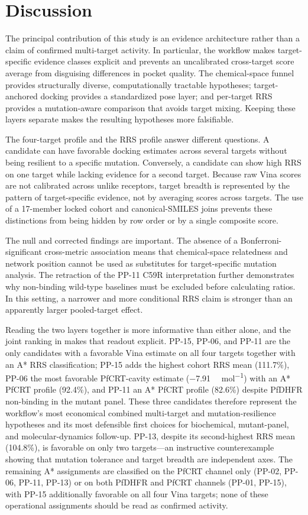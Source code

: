 \documentclass[journal=jcisd8,manuscript=article]{achemso}
\begin{document}
\section{Discussion}
The principal contribution of this study is an evidence architecture rather than a claim of confirmed multi-target activity. In particular, the workflow makes target-specific evidence classes explicit and prevents an uncalibrated cross-target score average from disguising differences in pocket quality. The chemical-space funnel provides structurally diverse, computationally tractable hypotheses; target-anchored docking provides a standardized pose layer; and per-target RRS provides a mutation-aware comparison that avoids target mixing. Keeping these layers separate makes the resulting hypotheses more falsifiable.

The four-target profile and the RRS profile answer different questions. A candidate can have favorable docking estimates across several targets without being resilient to a specific mutation. Conversely, a candidate can show high RRS on one target while lacking evidence for a second target. Because raw Vina scores are not calibrated across unlike receptors, target breadth is represented by the pattern of target-specific evidence, not by averaging scores across targets. The use of a 17-member locked cohort and canonical-SMILES joins prevents these distinctions from being hidden by row order or by a single composite score.

The null and corrected findings are important. The absence of a Bonferroni-significant cross-metric association means that chemical-space relatedness and network position cannot be used as substitutes for target-specific mutation analysis. The retraction of the PP-11 C59R interpretation further demonstrates why non-binding wild-type baselines must be excluded before calculating ratios. In this setting, a narrower and more conditional RRS claim is stronger than an apparently larger pooled-target effect.

Reading the two layers together is more informative than either alone, and the joint ranking in  makes that readout explicit. PP-15, PP-06, and PP-11 are the only candidates with a favorable Vina estimate on all four targets together with an A* RRS classification; PP-15 adds the highest cohort RRS mean (\num{111.7}\%), PP-06 the most favorable PfCRT-cavity estimate (\num{-7.91} \si{\kilo\calorie\per\mole}) with an A* PfCRT profile (\num{92.4}\%), and PP-11 an A* PfCRT profile (\num{82.6}\%) despite PfDHFR non-binding in the mutant panel. These three candidates therefore represent the workflow's most economical combined multi-target and mutation-resilience hypotheses and its most defensible first choices for biochemical, mutant-panel, and molecular-dynamics follow-up. PP-13, despite its second-highest RRS mean (\num{104.8}\%), is favorable on only two targets—an instructive counterexample showing that mutation tolerance and target breadth are independent axes. The remaining A* assignments are classified on the PfCRT channel only (PP-02, PP-06, PP-11, PP-13) or on both PfDHFR and PfCRT channels (PP-01, PP-15), with PP-15 additionally favorable on all four Vina targets; none of these operational assignments should be read as confirmed activity.
\end{document}
